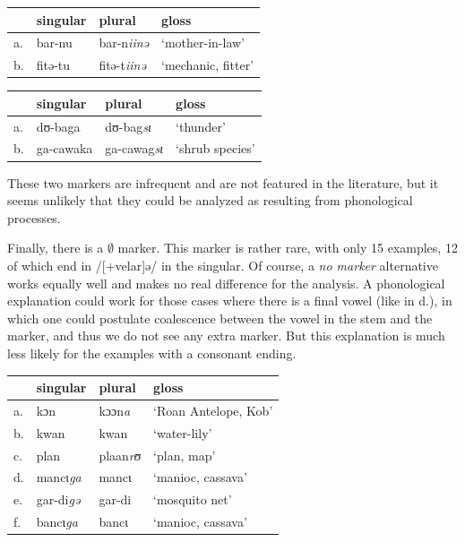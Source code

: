 \begin{exe}
    \ex \label{inne-kasem}
    \begin{tabular}[t]{llll}
      & singular & plural    & gloss              \\
      \midrule
      a. & bar-nu   & bar-n\textit{iinə}  & `mother-in-law'    \\
      b. & fitə-tu  & fitə-t\textit{iinə} & `mechanic, fitter' \\
    \end{tabular}
\end{exe}

\begin{exe}
    \ex \label{si-kasem}
    \begin{tabular}[t]{llll}
      & singular  & plural     & gloss           \\
      \midrule
      a. & dʊ-baga   & dʊ-bag\textit{sɩ}   & `thunder'       \\
      b. & ga-cawaka & ga-cawag\textit{sɩ} & `shrub species' \\
    \end{tabular}
\end{exe}

These two markers are infrequent and are not featured in the literature, but it seems unlikely that they could be analyzed as resulting from phonological processes.

Finally, there is a $\emptyset$ marker. This marker is rather rare, with only 15 examples, 12 of which end in /[+velar]ə/ in the singular. Of course, a \textit{no marker} alternative works equally well and makes no real difference for the analysis. A phonological explanation could work for those cases where there is a final vowel (like in d.), in which one could postulate coalescence between the vowel in the stem and the marker, and thus we do not see any extra marker. But this explanation is much less likely for the examples with a consonant ending.

\begin{exe}
    \ex \label{0-kasem}
    \begin{tabular}[t]{llll}
      & singular          & plural           & gloss                \\
      \midrule
      a. & kɔn               & kɔɔn\textit{a}   & `Roan Antelope, Kob' \\
      b. & kwan              & kwan             & `water-lily'         \\
      c. & plan              & plaan\textit{rʊ} & `plan, map'          \\
      d. & mancɩ\textit{ga}  & mancɩ            & `manioc, cassava'    \\
      e. & gar-di\textit{gə} & gar-di           & `mosquito net'       \\
      f. & bancɩ\textit{ga}  & bancɩ            & `manioc, cassava'    \\
    \end{tabular}
\end{exe}

